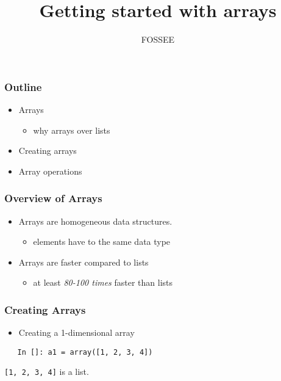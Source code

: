 \documentclass[presentation]{beamer}
\title{Getting started with arrays}
\author{FOSSEE}
\date{}
\begin{document}
\maketitle









\begin{frame}
\frametitle{Outline}
\label{sec-1}

\begin{itemize}
\item Arrays

\begin{itemize}
\item why arrays over lists
\end{itemize}

\item Creating arrays
\item Array operations
\end{itemize}
\end{frame}
\begin{frame}
\frametitle{Overview of Arrays}
\label{sec-2}

\begin{itemize}
\item Arrays are homogeneous data structures.

\begin{itemize}
\item elements have to the same data type
\end{itemize}

\item Arrays are faster compared to lists

\begin{itemize}
\item at least \emph{80-100 times} faster than lists
\end{itemize}

\end{itemize}
\end{frame}
\begin{frame}[fragile]
\frametitle{Creating Arrays}
\label{sec-3}

\begin{itemize}
\item Creating a 1-dimensional array
\end{itemize}

\begin{verbatim}
   In []: a1 = array([1, 2, 3, 4])
\end{verbatim}

  \texttt{[1, 2, 3, 4]} is a list.
\end{frame}
\end{document}
